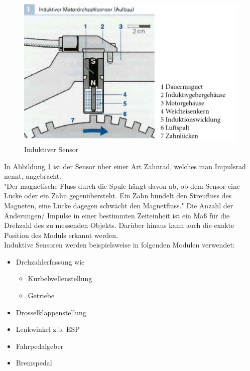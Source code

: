 				\begin{figure}[h]
					\centering
					\includegraphics{Induktiv_mit_legende.jpg}
					\caption[www.kfztech.de/kfztechnik/elo/sensoren/induktivgeber.htm]{Induktiver Sensor}
					\label{fig:TS03}
				\end{figure}
				
				In Abbildung \ref{fig:TS03} ist der Sensor über einer Art Zahnrad, welches man Impulsrad nennt, angebracht.\\
	            
	            "Der magnetische Fluss durch die Spule hängt davon ab, ob dem Sensor eine Lücke oder ein Zahn gegenübersteht. Ein Zahn bündelt den Streufluss des Magneten, eine Lücke dagegen schwächt den Magnetfluss." \cite{TS_ind_funkt}  
				Die Anzahl der Änderungen/ Impulse in einer bestimmten Zeiteinheit ist ein Maß für die Drehzahl des zu messenden Objekts. Darüber hinaus kann auch die exakte Position des Moduls erkannt werden.\\					
	            
				Induktive Sensoren werden beispielsweise in folgenden Modulen verwendet:
				
				\begin{itemize}
					\item Drehzahlerfassung wie
						\begin{itemize}
							\item Kurbelwellenstellung
							\item Getriebe
						\end{itemize}	
					\item Drosselklappenstellung
					\item Lenkwinkel z.b. ESP
					\item Fahrpedalgeber
					\item Bremspedal
				\end{itemize}
			
